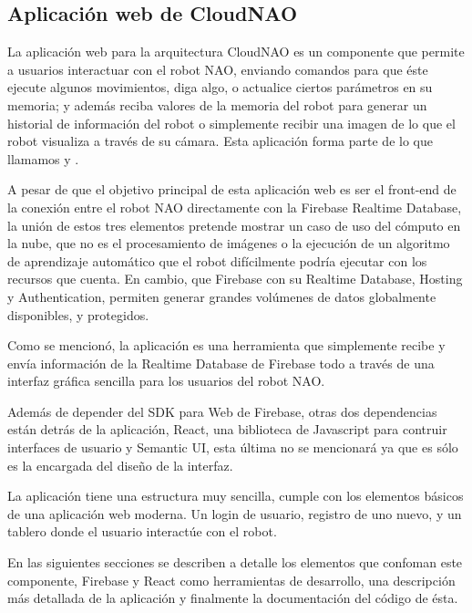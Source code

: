 
\subsection{Aplicación web de CloudNAO}
\label{\detokenize{nao_web:introduccion}}
La aplicación web para la arquitectura CloudNAO es un componente que permite a
usuarios interactuar con el robot NAO, enviando comandos para que éste ejecute
algunos movimientos, diga algo, o actualice ciertos parámetros en su memoria;
y además reciba valores de la memoria del robot para generar un historial
de información del robot o simplemente recibir una imagen de lo que el robot
visualiza a través de su cámara. Esta aplicación forma parte de lo que
llamamos  y .

A pesar de que el objetivo principal de esta aplicación web es ser el
front-end de la conexión entre el robot NAO directamente con la Firebase
Realtime Database, la unión de estos tres elementos pretende
mostrar un caso de uso del cómputo en la nube, que no es el procesamiento de
imágenes o la ejecución de un algoritmo de aprendizaje automático que el robot
difícilmente podría ejecutar con los recursos que cuenta. En cambio,
que Firebase con su Realtime Database, Hosting y Authentication, permiten
generar grandes volúmenes de datos globalmente disponibles, y protegidos.

Como se mencionó, la aplicación es una herramienta que simplemente recibe y envía información de la Realtime Database de
Firebase todo a través de una interfaz gráfica sencilla para los usuarios
del robot NAO.

Además de depender del SDK para Web de Firebase, otras dos dependencias están
detrás de la aplicación, React, una biblioteca de Javascript para contruir
interfaces de usuario y Semantic UI, esta última no se mencionará ya que
es sólo es la encargada del diseño de la interfaz.

La aplicación tiene una estructura muy sencilla, cumple con los elementos
básicos de una aplicación web moderna. Un login de usuario, registro de uno
nuevo, y un tablero donde el usuario interactúe con el robot.

En las siguientes secciones se describen a detalle los elementos que confoman
este componente, Firebase y React como herramientas de desarrollo,
una descripción más detallada de la aplicación y finalmente la documentación
del código de ésta.



